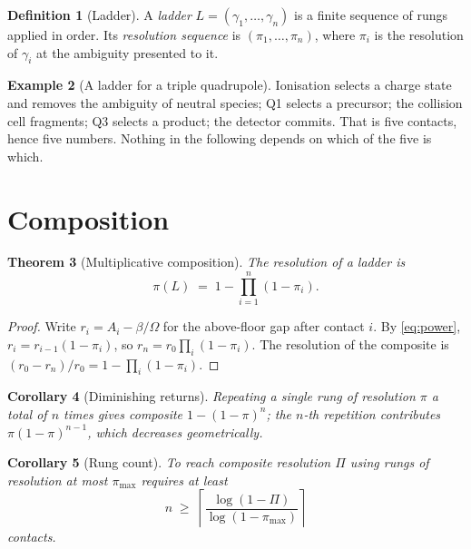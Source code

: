 \documentclass[11pt,a4paper]{article}
\theoremstyle{plain}
\newtheorem{theorem}{Theorem}[section]
\newtheorem{corollary}[theorem]{Corollary}
\theoremstyle{definition}
\newtheorem{definition}[theorem]{Definition}
\newtheorem{example}[theorem]{Example}
\theoremstyle{remark}
\newcommand{\flo}{\beta}
\newcommand{\pow}{\pi}
\newcommand{\gap}{r}
\newcommand{\Tot}{\Omega}
\newcommand{\Lad}{L}
\newcommand{\Rung}{\gamma}
\newcommand{\Amb}{A}
\begin{document}
\begin{definition}[Ladder]
\label{def:ladder}
A \emph{ladder} $\Lad = (\Rung_1,\dots,\Rung_n)$ is a finite sequence of rungs
applied in order. Its \emph{resolution sequence} is $(\pow_1,\dots,\pow_n)$,
where $\pow_i$ is the resolution of $\Rung_i$ at the ambiguity presented to it.
\end{definition}

\begin{example}[A ladder for a triple quadrupole]
\label{ex:tripleq}
Ionisation \citep{fenn1989} selects a charge state and removes the ambiguity of
neutral species; Q1 selects a precursor; the collision cell fragments; Q3
selects a product; the detector commits. That is five contacts, hence five
numbers. Nothing in the following depends on which of the five is which.
\end{example}

\section{Composition}
\label{sec:composition}

\begin{theorem}[Multiplicative composition]
\label{thm:multiplicative}
The resolution of a ladder is
\begin{equation}
\label{eq:compose}
\pow(\Lad) \;=\; 1 - \prod_{i=1}^{n} (1 - \pow_i).
\end{equation}
\end{theorem}

\begin{proof}
Write $\gap_i = \Amb_i - \flo/\Tot$ for the above-floor gap after contact $i$.
By \cref{eq:power}, $\gap_i = \gap_{i-1}(1 - \pow_i)$, so
$\gap_n = \gap_0\prod_i(1-\pow_i)$. The resolution of the composite is
$(\gap_0 - \gap_n)/\gap_0 = 1 - \prod_i(1-\pow_i)$.
\end{proof}

\begin{corollary}[Diminishing returns]
\label{cor:diminishing}
Repeating a single rung of resolution $\pow$ a total of $n$ times gives
composite $1-(1-\pow)^n$; the $n$-th repetition contributes
$\pow(1-\pow)^{n-1}$, which decreases geometrically.
\end{corollary}

\begin{corollary}[Rung count]
\label{cor:diversify}
To reach composite resolution $\Pi$ using rungs of resolution at most
$\pow_{\max}$ requires at least
\begin{equation}
\label{eq:rungcount}
n \;\ge\; \left\lceil \frac{\log(1-\Pi)}{\log(1-\pow_{\max})} \right\rceil
\end{equation}
contacts.
\end{corollary}
\end{document}
